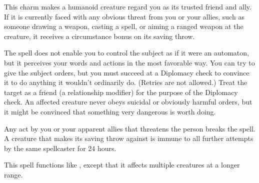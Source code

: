 \spellrng{\rngmed}
\spelldur{\durlong}
\begin{spelleffect}
  This charm makes a humanoid creature regard you as its trusted friend and ally. If it is currently faced with any obvious threat from you or your allies, such as someone drawing a weapon, casting a spell, or aiming a ranged weapon at the creature, it receives a  circumstance bonus on its saving throw.
  \par The spell does not enable you to control the subject as if it were an automaton, but it perceives your words and actions in the most favorable way. You can try to give the subject orders, but you must succeed at a Diplomacy check to convince it to do anything it wouldn't ordinarily do. (Retries are not allowed.) Treat the target as a friend (a  relationship modifier) for the purpose of the Diplomacy check. An affected creature never obeys suicidal or obviously harmful orders, but it might be convinced that something very dangerous is worth doing.
\end{spelleffect}
\begin{spellnotes}
  Any act by you or your apparent allies that threatens the  person breaks the spell. A creature that makes its saving throw against  is immune to all further attempts by the same spellcaster for 24 hours.
\end{spellnotes}

\begin{spelleffect}
  This spell functions like , except that it affects multiple creatures at a longer range.
\end{spelleffect}

